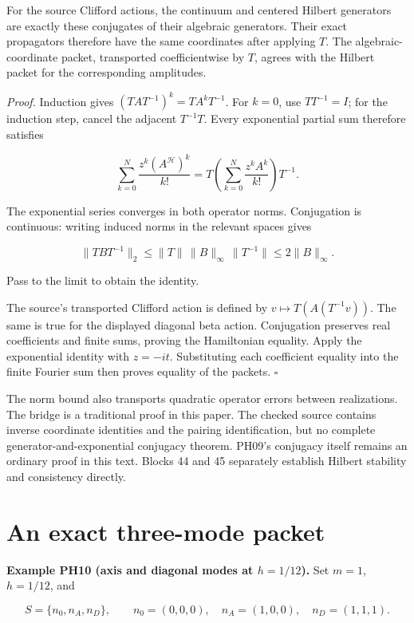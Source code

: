 For the source Clifford actions, the continuum and centered Hilbert
generators are exactly these conjugates of their algebraic generators.
Their exact propagators therefore have the same coordinates after
applying \(T\). The algebraic-coordinate packet, transported coefficientwise by
\(T\), agrees with the Hilbert packet for the corresponding
amplitudes.

\emph{Proof.} Induction gives \((TAT^{-1})^k=TA^kT^{-1}\). For
\(k=0\), use \(TT^{-1}=I\); for the induction step, cancel the adjacent
\(T^{-1}T\). Every exponential partial sum therefore satisfies

\[
\sum_{k=0}^{N}\frac{z^k(A^{\mathcal H})^k}{k!}
=T\left(\sum_{k=0}^{N}\frac{z^kA^k}{k!}\right)T^{-1}.
\]

The exponential series converges in both operator norms. Conjugation is
continuous: writing induced norms in the relevant spaces gives

\[
\|TBT^{-1}\|_2\le\|T\|\,\|B\|_\infty\,\|T^{-1}\|
\le2\|B\|_\infty.
\]

Pass to the limit to obtain the identity.

The source's transported Clifford action is defined by
\(v\mapsto T(A(T^{-1}v))\). The same is true for the displayed diagonal
beta action. Conjugation preserves real coefficients and finite sums,
proving the Hamiltonian equality. Apply the exponential identity with
\(z=-it\). Substituting each coefficient equality into the finite
Fourier sum then proves equality of the packets. \(\square\)

The norm bound also transports quadratic operator errors between
realizations. The bridge is a traditional proof in this paper. The
checked source contains inverse coordinate identities and the pairing
identification, but no complete generator-and-exponential conjugacy
theorem. PH09's conjugacy itself remains an ordinary proof in this text.
Blocks 44 and 45 separately establish Hilbert stability and consistency
directly.

\hypertarget{an-exact-three-mode-packet}{%
\section{An exact three-mode packet}\label{an-exact-three-mode-packet}}

\textbf{Example PH10 (axis and diagonal modes at \(h=1/12\)).} Set
\(m=1\), \(h=1/12\), and

\[
S=\{n_0,n_A,n_D\},\qquad
n_0=(0,0,0),\quad n_A=(1,0,0),\quad n_D=(1,1,1).
\]

